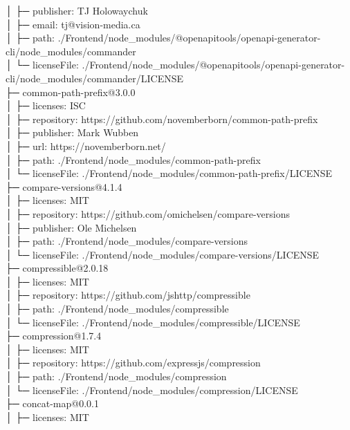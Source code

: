 \documentclass[
    paper=a4,
    twoside=false,
    parskip=half,
    listof=entryprefix,
    listof=totoc,
    index=totoc,
    bibliography=totoc,
    headsepline,
]{scrbook}
\begin{document}
    │  ├─ publisher: TJ Holowaychuk\\
    │  ├─ email: tj@vision-media.ca\\
    │  ├─ path: ./Frontend/node\_modules/@openapitools/openapi-generator-cli/node\_modules/commander\\
    │  └─ licenseFile: ./Frontend/node\_modules/@openapitools/openapi-generator-cli/node\_modules/commander/LICENSE\\
    ├─ common-path-prefix@3.0.0\\
    │  ├─ licenses: ISC\\
    │  ├─ repository: https://github.com/novemberborn/common-path-prefix\\
    │  ├─ publisher: Mark Wubben\\
    │  ├─ url: https://novemberborn.net/\\
    │  ├─ path: ./Frontend/node\_modules/common-path-prefix\\
    │  └─ licenseFile: ./Frontend/node\_modules/common-path-prefix/LICENSE\\
    ├─ compare-versions@4.1.4\\
    │  ├─ licenses: MIT\\
    │  ├─ repository: https://github.com/omichelsen/compare-versions\\
    │  ├─ publisher: Ole Michelsen\\
    │  ├─ path: ./Frontend/node\_modules/compare-versions\\
    │  └─ licenseFile: ./Frontend/node\_modules/compare-versions/LICENSE\\
    ├─ compressible@2.0.18\\
    │  ├─ licenses: MIT\\
    │  ├─ repository: https://github.com/jshttp/compressible\\
    │  ├─ path: ./Frontend/node\_modules/compressible\\
    │  └─ licenseFile: ./Frontend/node\_modules/compressible/LICENSE\\
    ├─ compression@1.7.4\\
    │  ├─ licenses: MIT\\
    │  ├─ repository: https://github.com/expressjs/compression\\
    │  ├─ path: ./Frontend/node\_modules/compression\\
    │  └─ licenseFile: ./Frontend/node\_modules/compression/LICENSE\\
    ├─ concat-map@0.0.1\\
    │  ├─ licenses: MIT\\
\end{document}
